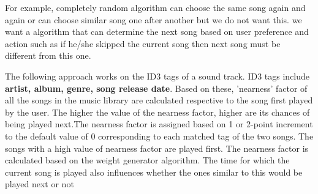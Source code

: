 For example, completely random algorithm can choose the same song again and again or can choose similar song one after another but we do not want this. we want a algorithm that can determine the next song based on user preference and action such as if he/she skipped the current song then next song must be different from this one.

The following approach works on the ID3 tags of a sound track. ID3 tags include \textbf{artist, album, genre, song release date}. Based on these, 'nearness' factor of all the songs in the music library are calculated respective to the song first played by the user. The higher the value of the nearness factor, higher are its chances of being played next.The nearness factor is assigned based on 1 or 2-point increment to the default value of 0 corresponding to each matched tag of the two songs. The songs with a high value of nearness factor are played first. The nearness factor is calculated based on the weight generator algorithm. The time for which the current song is played also influences whether the ones similar to this would be played next or not
